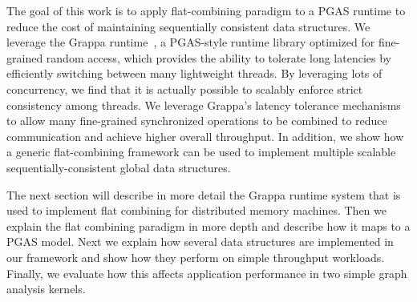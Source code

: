 The goal of this work is to apply flat-combining paradigm to a PGAS runtime to reduce the cost of maintaining sequentially consistent data structures.
We leverage the Grappa runtime~\cite{Nelson:hotpar11-real}, a PGAS-style runtime library optimized for fine-grained random access, which provides the ability to tolerate long latencies by efficiently switching between many lightweight threads.
By leveraging lots of concurrency, we find that it is actually possible to scalably enforce strict consistency among threads. We leverage Grappa's latency tolerance mechanisms to allow many fine-grained synchronized operations to be combined to reduce communication and achieve higher overall throughput.
In addition, we show how a generic flat-combining framework can be used to implement multiple scalable sequentially-consistent global data structures.

The next section will describe in more detail the Grappa runtime system that is used to implement flat combining for distributed memory machines. Then we explain the flat combining paradigm in more depth and describe how it maps to a PGAS model. Next we explain how several data structures are implemented in our framework and show how they perform on simple throughput workloads. Finally, we evaluate how this affects application performance in two simple graph analysis kernels.
